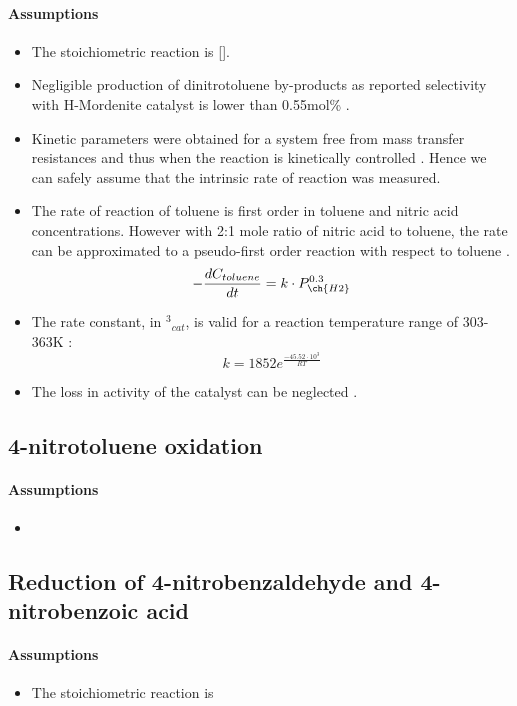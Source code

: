 \paragraph{Assumptions}
\begin{itemize}
    \item The stoichiometric reaction is  [].
    \item Negligible production of dinitrotoluene by-products as reported selectivity with H-Mordenite catalyst is lower than 0.55mol\% \cite{jeeru_kinetics_2018}.
    \item Kinetic parameters were obtained for a system free from mass transfer resistances and thus when the reaction is kinetically controlled \cite{jeeru_kinetics_2018}. Hence we can safely assume that the intrinsic rate of reaction was measured.
    \item The rate of reaction of toluene is first order in toluene and nitric acid concentrations. However with 2:1 mole ratio of nitric acid to toluene, the rate can be approximated to a pseudo-first order reaction with respect to toluene \cite{jeeru_kinetics_2018}.
    \begin{equation}
    - \frac{dC_{toluene}}{dt}=k \cdot P_{\ch{H2}}^{0.3} 
    \end{equation}
    \item The rate constant, in \mol\per\kPa$^{3}$\g$_{cat}$\s, is valid for a reaction temperature range of 303-363K \cite{}:
    \begin{equation}
        k=1852e^{\frac{-45.52\cdot 10^{3}}{RT}}
    \end{equation}
    \item The loss in activity of the catalyst can be neglected \cite{}.
\end{itemize}

\subsection{4-nitrotoluene oxidation}
\paragraph{Assumptions}
\begin{itemize}
    \item 
\end{itemize}

\subsection{Reduction of 4-nitrobenzaldehyde and 4-nitrobenzoic acid}
\paragraph{Assumptions}
\begin{itemize}
    \item The stoichiometric reaction is 
\end{itemize}
